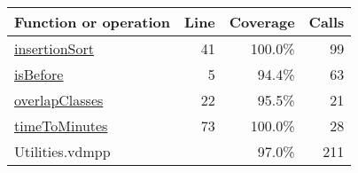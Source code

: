 \bigskip
\begin{longtable}{|l|r|r|r|}
\hline
Function or operation & Line & Coverage & Calls \\
\hline
\hline
\hyperref[insertionSort:41]{insertionSort} & 41&100.0\% & 99 \\
\hline
\hyperref[isBefore:5]{isBefore} & 5&94.4\% & 63 \\
\hline
\hyperref[overlapClasses:22]{overlapClasses} & 22&95.5\% & 21 \\
\hline
\hyperref[timeToMinutes:73]{timeToMinutes} & 73&100.0\% & 28 \\
\hline
\hline
Utilities.vdmpp & & 97.0\% & 211 \\
\hline
\end{longtable}


